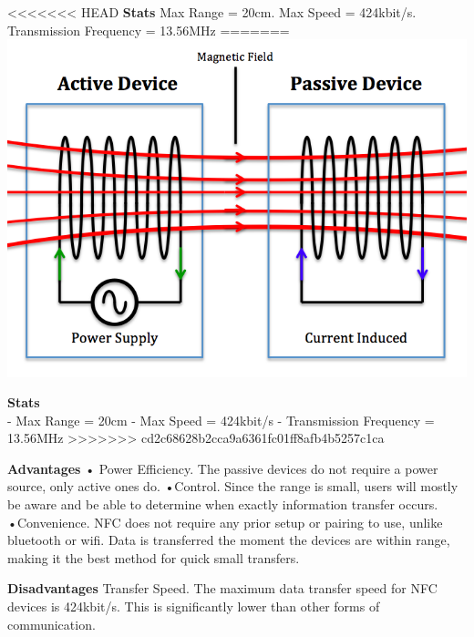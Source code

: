 \documentclass[a0paper,portrait]{baposter}
\begin{document}
\begin{poster}
{<<<<<<< HEAD
\textbf{Stats}
Max Range = 20cm. Max Speed = 424kbit/s. Transmission Frequency = 13.56MHz
=======
{\includegraphics[scale=0.15]{NFC_Diagram}}

\textbf{Stats}\\
- Max Range = 20cm 
- Max Speed = 424kbit/s
- Transmission Frequency = 13.56MHz
>>>>>>> cd2c68628b2cca9a6361fc01ff8afb4b5257c1ca

\textbf{Advantages}
• Power Efficiency. The passive devices do not require a power source, only active ones do.
•Control. Since the range is small, users will mostly be aware and be able to determine when exactly information transfer occurs.
•Convenience. NFC does not require any prior setup or pairing to use, unlike bluetooth or wifi. Data is transferred the moment the devices are within range, making it the best method for quick small transfers.

\textbf{Disadvantages}
Transfer Speed. The maximum data transfer speed for NFC devices is 424kbit/s. This is significantly lower than other forms of communication. 

}


\end{poster}
\end{document}
